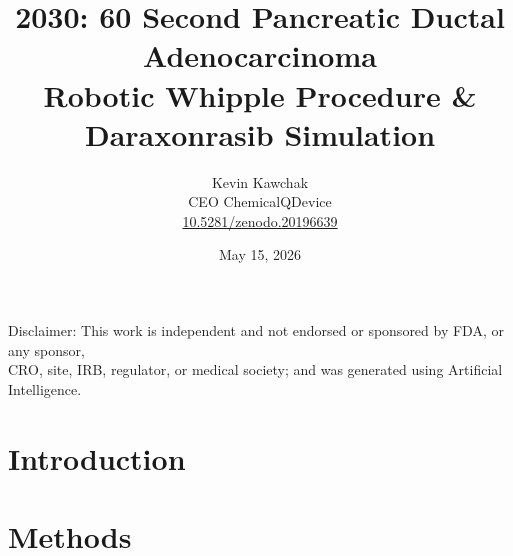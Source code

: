 \documentclass[11pt]{article}
\title{2030: 60 Second Pancreatic Ductal Adenocarcinoma\\Robotic Whipple Procedure \& Daraxonrasib Simulation}
\author{
  Kevin Kawchak\hspace{2pt}\orcidicon{0009-0007-5457-8667} \\
  CEO ChemicalQDevice\\
  \href{https://doi.org/10.5281/zenodo.20196639}{10.5281/zenodo.20196639} \\
}
\date{May 15, 2026}
\begin{document}
\maketitle

\begin{abstract}

\end{abstract}

\begin{center}
\normalsize
Disclaimer: This work is independent and not endorsed or sponsored by FDA, or any sponsor,\\CRO, site, IRB, regulator, or medical society;
and was generated using Artificial Intelligence.
\end{center}


\vspace{-0.2cm}

\section{Introduction}
\label{sec:introduction}


\tableofcontents

\vspace{0.4cm}

\newpage
\section{Methods}
\label{sec:methods}


\end{document}
